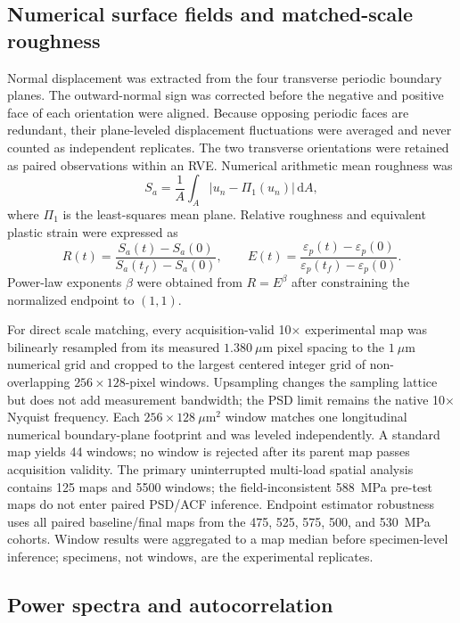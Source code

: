 \documentclass[final,12pt]{cas-sc}
\begin{document}
\subsection{Numerical surface fields and matched-scale roughness}

Normal displacement was extracted from the four transverse periodic boundary planes. The outward-normal sign was corrected before the negative and positive face of each orientation were aligned. Because opposing periodic faces are redundant, their plane-leveled displacement fluctuations were averaged and never counted as independent replicates. The two transverse orientations were retained as paired observations within an RVE. Numerical arithmetic mean roughness was
\begin{equation}
    S_a=\frac{1}{A}\int_A\left|u_n-\Pi_1(u_n)\right|\,\mathrm{d}A,
\end{equation}
where $\Pi_1$ is the least-squares mean plane. Relative roughness and equivalent plastic strain were expressed as
\begin{equation}
    R(t)=\frac{S_a(t)-S_a(0)}{S_a(t_f)-S_a(0)},
    \qquad
    E(t)=\frac{\varepsilon_p(t)-\varepsilon_p(0)}
    {\varepsilon_p(t_f)-\varepsilon_p(0)}.
\end{equation}
Power-law exponents $\beta$ were obtained from $R=E^\beta$ after constraining the normalized endpoint to $(1,1)$.

For direct scale matching, every acquisition-valid 10$\times$ experimental map was bilinearly resampled from its measured $1.380~\mu$m pixel spacing to the $1~\mu$m numerical grid and cropped to the largest centered integer grid of non-overlapping $256\times128$-pixel windows. Upsampling changes the sampling lattice but does not add measurement bandwidth; the PSD limit remains the native 10$\times$ Nyquist frequency. Each $256\times128~\mu\mathrm{m}^2$ window matches one longitudinal numerical boundary-plane footprint and was leveled independently. A standard map yields 44 windows; no window is rejected after its parent map passes acquisition validity. The primary uninterrupted multi-load spatial analysis contains 125 maps and 5500 windows; the field-inconsistent 588~MPa pre-test maps do not enter paired PSD/ACF inference. Endpoint estimator robustness uses all paired baseline/final maps from the 475, 525, 575, 500, and 530~MPa cohorts. Window results were aggregated to a map median before specimen-level inference; specimens, not windows, are the experimental replicates.

\subsection{Power spectra and autocorrelation}
\end{document}
